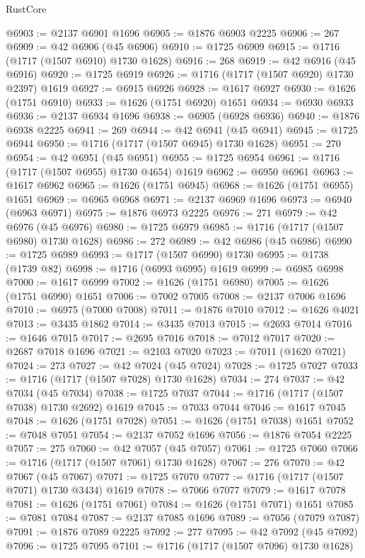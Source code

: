 \begin{lexlean}{RustCore}
\begin{coremodule}
@6903 := @2137 @6901 @1696
@6905 := @1876 @6903 @2225
@6906 := 267
@6909 := @42 @6906 (@45 @6906)
@6910 := @1725 @6909
@6915 := @1716 (@1717 (@1507 @6910) @1730 @1628)
@6916 := 268
@6919 := @42 @6916 (@45 @6916)
@6920 := @1725 @6919
@6926 := @1716 (@1717 (@1507 @6920) @1730 @2397) @1619
@6927 := @6915 @6926
@6928 := @1617 @6927
@6930 := @1626 (@1751 @6910)
@6933 := @1626 (@1751 @6920) @1651
@6934 := @6930 @6933
@6936 := @2137 @6934 @1696
@6938 := @6905 (@6928 @6936)
@6940 := @1876 @6938 @2225
@6941 := 269
@6944 := @42 @6941 (@45 @6941)
@6945 := @1725 @6944
@6950 := @1716 (@1717 (@1507 @6945) @1730 @1628)
@6951 := 270
@6954 := @42 @6951 (@45 @6951)
@6955 := @1725 @6954
@6961 := @1716 (@1717 (@1507 @6955) @1730 @4654) @1619
@6962 := @6950 @6961
@6963 := @1617 @6962
@6965 := @1626 (@1751 @6945)
@6968 := @1626 (@1751 @6955) @1651
@6969 := @6965 @6968
@6971 := @2137 @6969 @1696
@6973 := @6940 (@6963 @6971)
@6975 := @1876 @6973 @2225
@6976 := 271
@6979 := @42 @6976 (@45 @6976)
@6980 := @1725 @6979
@6985 := @1716 (@1717 (@1507 @6980) @1730 @1628)
@6986 := 272
@6989 := @42 @6986 (@45 @6986)
@6990 := @1725 @6989
@6993 := @1717 (@1507 @6990) @1730
@6995 := @1738 (@1739 @82)
@6998 := @1716 (@6993 @6995) @1619
@6999 := @6985 @6998
@7000 := @1617 @6999
@7002 := @1626 (@1751 @6980)
@7005 := @1626 (@1751 @6990) @1651
@7006 := @7002 @7005
@7008 := @2137 @7006 @1696
@7010 := @6975 (@7000 @7008)
@7011 := @1876 @7010
@7012 := @1626 @4021
@7013 := @3435 @1862
@7014 := @3435 @7013
@7015 := @2693 @7014
@7016 := @1646 @7015
@7017 := @2695 @7016
@7018 := @7012 @7017
@7020 := @2687 @7018 @1696
@7021 := @2103 @7020
@7023 := @7011 (@1620 @7021)
@7024 := 273
@7027 := @42 @7024 (@45 @7024)
@7028 := @1725 @7027
@7033 := @1716 (@1717 (@1507 @7028) @1730 @1628)
@7034 := 274
@7037 := @42 @7034 (@45 @7034)
@7038 := @1725 @7037
@7044 := @1716 (@1717 (@1507 @7038) @1730 @2692) @1619
@7045 := @7033 @7044
@7046 := @1617 @7045
@7048 := @1626 (@1751 @7028)
@7051 := @1626 (@1751 @7038) @1651
@7052 := @7048 @7051
@7054 := @2137 @7052 @1696
@7056 := @1876 @7054 @2225
@7057 := 275
@7060 := @42 @7057 (@45 @7057)
@7061 := @1725 @7060
@7066 := @1716 (@1717 (@1507 @7061) @1730 @1628)
@7067 := 276
@7070 := @42 @7067 (@45 @7067)
@7071 := @1725 @7070
@7077 := @1716 (@1717 (@1507 @7071) @1730 @3434) @1619
@7078 := @7066 @7077
@7079 := @1617 @7078
@7081 := @1626 (@1751 @7061)
@7084 := @1626 (@1751 @7071) @1651
@7085 := @7081 @7084
@7087 := @2137 @7085 @1696
@7089 := @7056 (@7079 @7087)
@7091 := @1876 @7089 @2225
@7092 := 277
@7095 := @42 @7092 (@45 @7092)
@7096 := @1725 @7095
@7101 := @1716 (@1717 (@1507 @7096) @1730 @1628)

\end{coremodule}
\end{lexlean}
